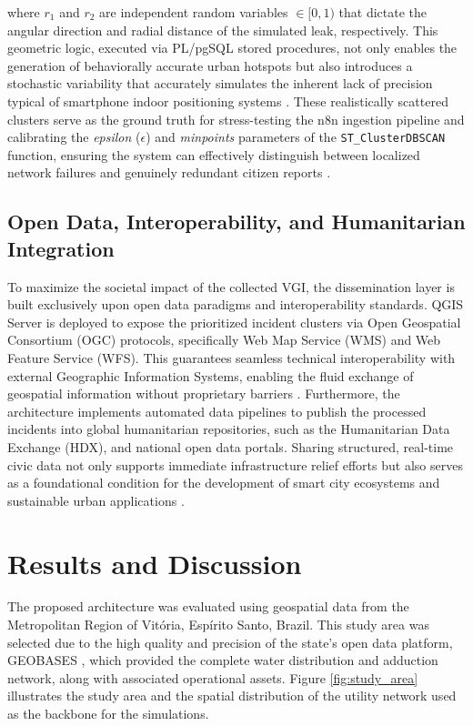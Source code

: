 \documentclass[conference]{IEEEtran}
\renewcommand\hl[1]{#1}
\begin{document}
where $r_1$ and $r_2$ are independent random variables $\in [0, 1)$ \hl{that dictate the angular direction and radial distance of the simulated leak, respectively.} This geometric logic, executed via PL/pgSQL stored procedures, not only enables the generation of behaviorally accurate urban hotspots but also introduces a stochastic variability that accurately simulates the inherent lack of precision typical of smartphone indoor positioning systems \cite{liu2025}. These realistically scattered clusters serve as the ground truth for stress-testing the n8n ingestion pipeline and calibrating the \textit{epsilon} ($\epsilon$) and \textit{minpoints} parameters of the \texttt{ST\_ClusterDBSCAN} function, ensuring the system can effectively distinguish between localized network failures and genuinely redundant citizen reports \cite{starczewski2020}.

\subsection{Open Data, Interoperability, and Humanitarian Integration}

To maximize the societal impact of the collected VGI, the dissemination layer is built exclusively upon open data paradigms and interoperability standards. QGIS Server is deployed to expose the prioritized incident clusters via Open Geospatial Consortium (OGC) protocols, specifically Web Map Service (WMS) and Web Feature Service (WFS). This guarantees seamless technical interoperability with external Geographic Information Systems, enabling the fluid exchange of geospatial information without proprietary barriers \cite{coetzee2020review}. Furthermore, the architecture implements automated data pipelines to publish the processed incidents into global humanitarian repositories, such as the Humanitarian Data Exchange (HDX), and national open data portals. Sharing structured, real-time civic data not only supports immediate infrastructure relief efforts but also serves as a foundational condition for the development of smart city ecosystems and sustainable urban applications \cite{seljan2022}.

\section{Results and Discussion}
 \label{results_and_discussion}

The proposed architecture was evaluated using geospatial data from the Metropolitan Region of Vitória, Espírito Santo, Brazil. This study area was selected due to the high quality and precision of the state's open data platform, GEOBASES \cite{geobases_ide}, which provided the complete water distribution and adduction network, along with associated operational assets. Figure \ref{fig:study_area} illustrates the study area and the spatial distribution of the utility network used as the backbone for the simulations.
\end{document}
